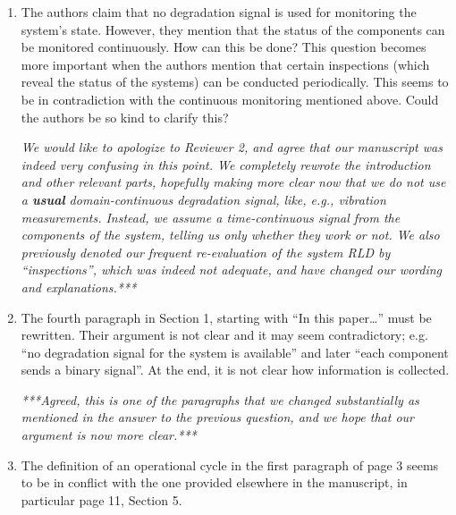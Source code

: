 \documentclass[authoryear]{elsarticle}
\begin{document}
\begin{enumerate}
\item The authors claim that no degradation signal is used for monitoring the system’s state. However, they mention that the status of the components can be monitored continuously. How can this be done? This question becomes more important when the authors mention that certain inspections (which reveal the status of the systems) can be conducted periodically. This seems to be in contradiction with the continuous monitoring mentioned above. Could the authors be so kind to clarify this?

\smallskip

\emph{We would like to apologize to Reviewer 2,
and agree that our manuscript was indeed very confusing in this point.
We completely rewrote the introduction and other relevant parts,
hopefully making more clear now that 
we do not use a \textbf{usual} domain-continuous degradation signal, like, e.g., vibration measurements.
Instead, we assume a time-continuous signal from the components of the system, telling us only whether they work or not.
We also previously denoted our frequent re-evaluation of the system RLD by ``inspections'',
which was indeed not adequate, and have changed our wording and explanations.***}

\item The fourth paragraph in Section 1, starting with “In this paper…” must be rewritten. Their argument is not clear and it may seem contradictory; e.g. “no degradation signal for the system is available” and later “each component sends a binary signal”. At the end, it is not clear how information is collected.

\smallskip

\emph{***Agreed, this is one of the paragraphs that we changed substantially as mentioned in the answer to the previous question,
and we hope that our argument is now more clear.***}

\item The definition of an operational cycle in the first paragraph of page 3 seems to be in conflict with the one provided elsewhere in the manuscript, in particular page 11, Section 5.


\end{enumerate}
\end{document}
